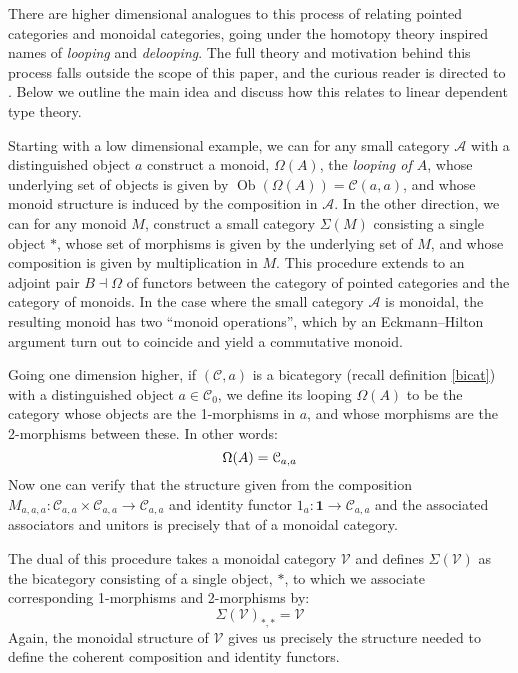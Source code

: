 \documentclass[a4paper,english]{lipics-v2018}
\DeclareMathOperator{\Ob}{\text{Ob}}
\begin{document}
There are higher dimensional analogues to this process of relating pointed categories and monoidal categories, going under the homotopy theory inspired names of \textit{looping} and \textit{delooping}. The full theory and motivation behind this process falls outside the scope of this paper, and the curious reader is directed to \cite{n-cats}. Below we outline the main idea and discuss how this relates to linear dependent type theory.

Starting with a low dimensional example, we can for any small category $\mathcal{A}$ with a distinguished object $a$ construct a monoid, $\Omega(A)$, the \textit{looping of $A$}, whose underlying set of objects is given by $\Ob(\Omega(A)) = \mathcal{C}(a,a)$, and whose monoid structure is induced by the composition in $\mathcal{A}$. In the other direction, we can for any monoid $M$, construct a small category $\Sigma(M)$ consisting a single object $*$, whose set of morphisms is given by the underlying set of $M$, and whose composition is given by multiplication in $M$. This procedure extends to an adjoint pair $B \dashv \Omega$ of functors between the category of pointed categories and the category of monoids.
In the case where the small category $\mathcal{A}$ is monoidal, the resulting monoid has two ``monoid operations'', which by an Eckmann--Hilton argument turn out to coincide and yield a commutative monoid.

Going one dimension higher, if $(\mathcal{C}, a)$ is a bicategory (recall definition \ref{bicat}) with a distinguished object $a \in \mathcal{C}_0$, we define its looping $\Omega(A)$ to be the category whose objects are the 1-morphisms in $a$, and whose morphisms are the 2-morphisms between these. In other words:
\[
  \Omega(A) = \mathcal{C}_{a,a}\\
\]
Now one can verify that the structure given from the composition $M_{a,a,a} : \mathcal{C}_{a,a} \times \mathcal{C}_{a,a} \to \mathcal{C}_{a,a}$ and identity functor $1_a : \mathbf{1} \to \mathcal{C}_{a,a}$ and the associated associators and unitors is precisely that of a monoidal category.

The dual of this procedure takes a monoidal category $\mathcal{V}$ and defines $\Sigma(\mathcal{V})$ as the bicategory consisting of a single object, $*$, to which we associate corresponding 1-morphisms and 2-morphisms by:
\[
\Sigma(\mathcal{V})_{*,*} = \mathcal{V}
\]
Again, the monoidal structure of $\mathcal{V}$ gives us precisely the structure needed to define the coherent composition and identity functors.
\end{document}
